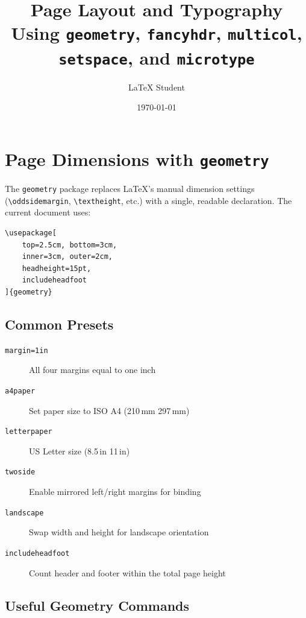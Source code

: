 \documentclass[12pt,a4paper,twoside]{article}
\title{\textbf{Page Layout and Typography}\\[0.4em]
       \large Using \texttt{geometry}, \texttt{fancyhdr},
              \texttt{multicol}, \texttt{setspace}, and \texttt{microtype}}
\author{LaTeX Student}
\date{\today}
\begin{document}
\maketitle
\tableofcontents
\clearpage


\section{Page Dimensions with \texttt{geometry}}
\label{sec:geometry}

The \texttt{geometry} package replaces \LaTeX's manual dimension settings
(\verb|\oddsidemargin|, \verb|\textheight|, etc.) with a single, readable
declaration. The current document uses:

\begin{verbatim}
\usepackage[
    top=2.5cm, bottom=3cm,
    inner=3cm, outer=2cm,
    headheight=15pt,
    includeheadfoot
]{geometry}
\end{verbatim}

\subsection{Common Presets}

\begin{description}
    \item[\texttt{margin=1in}]       All four margins equal to one inch
    \item[\texttt{a4paper}]          Set paper size to ISO A4 (210\,mm \texttimes{} 297\,mm)
    \item[\texttt{letterpaper}]      US Letter size (8.5\,in \texttimes{} 11\,in)
    \item[\texttt{twoside}]          Enable mirrored left/right margins for binding
    \item[\texttt{landscape}]        Swap width and height for landscape orientation
    \item[\texttt{includeheadfoot}]  Count header and footer within the total page height
\end{description}

\subsection{Useful Geometry Commands}
\end{document}
